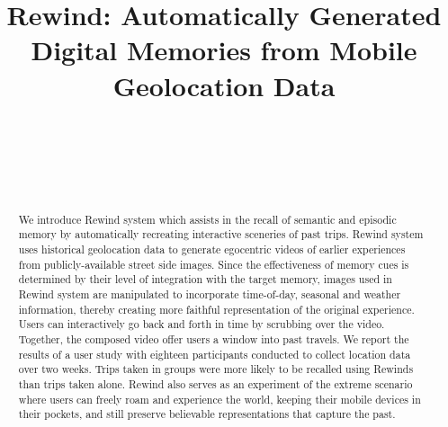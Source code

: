\documentclass{sigchi}
\begin{document}
\title{Rewind: Automatically Generated\\Digital Memories from Mobile Geolocation Data}

\author{
  \alignauthor {~}\\
    \affaddr{~}\\
    \affaddr{~}\\
    \email{~}\\
}


\maketitle


\begin{abstract}
We introduce Rewind system which assists in the recall of semantic and episodic memory by automatically recreating interactive sceneries of past trips. Rewind system uses historical geolocation data to generate egocentric videos of earlier experiences from publicly-available street side images. Since the effectiveness of memory cues is determined by their level of integration with the target memory, images used in Rewind system are manipulated to incorporate time-of-day, seasonal and weather information, thereby creating more faithful representation of the original experience. Users can interactively go back and forth in time by scrubbing over the video. Together, the composed video offer users a window into past travels. We report the results of a user study with eighteen participants conducted to collect location data over two weeks. Trips taken in groups were more likely to be recalled using Rewinds than trips taken alone. Rewind also serves as an experiment of the extreme scenario where users can freely roam and experience the world, keeping their mobile devices in their pockets, and still preserve believable representations that capture the past.
\end{abstract}
\end{document}
